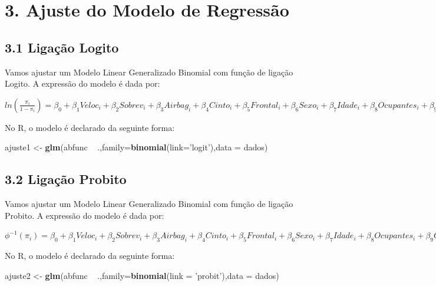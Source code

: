 \documentclass[]{article}
\newenvironment{Shaded}{\begin{snugshade}}{\end{snugshade}}
\newcommand{\KeywordTok}[1]{\textcolor[rgb]{0.13,0.29,0.53}{\textbf{{#1}}}}
\newcommand{\DataTypeTok}[1]{\textcolor[rgb]{0.13,0.29,0.53}{{#1}}}
\newcommand{\StringTok}[1]{\textcolor[rgb]{0.31,0.60,0.02}{{#1}}}
\newcommand{\NormalTok}[1]{{#1}}
\begin{document}
\section{3. Ajuste do Modelo de
Regressão}\label{ajuste-do-modelo-de-regressao}

\subsection{\texorpdfstring{\textbf{3.1 Ligação
Logito}}{3.1 Ligação Logito}}\label{ligacao-logito}

Vamos ajustar um Modelo Linear Generalizado Binomial com função de
ligação Logito. A expressão do modelo é dada por:

\(ln (\frac{\pi_i}{1-\pi_i}) = \beta_0 + \beta_1 Veloc_i + \beta_2 Sobrev_i + \beta_3 Airbag_i + \beta_4 Cinto_i + \beta_5 Frontal_i + \beta_6 Sexo_i + \beta_7 Idade_i + \beta_8 Ocupantes_i + \beta_9 Grav_i\)

No R, o modelo é declarado da seguinte forma:

\begin{Shaded}
\begin{Highlighting}[]
\NormalTok{ajuste1 <-}\StringTok{ }\KeywordTok{glm}\NormalTok{(abfunc ~}\StringTok{ }\NormalTok{.,}\DataTypeTok{family=}\KeywordTok{binomial}\NormalTok{(}\DataTypeTok{link=}\StringTok{'logit'}\NormalTok{),}\DataTypeTok{data =} \NormalTok{dados)}
\end{Highlighting}
\end{Shaded}

\subsection{\texorpdfstring{\textbf{3.2 Ligação
Probito}}{3.2 Ligação Probito}}\label{ligacao-probito}

Vamos ajustar um Modelo Linear Generalizado Binomial com função de
ligação Probito. A expressão do modelo é dada por:

\(\phi^{-1} (\pi_i) = \beta_0 + \beta_1 Veloc_i + \beta_2 Sobrev_i + \beta_3 Airbag_i + \beta_4 Cinto_i + \beta_5 Frontal_i + \beta_6 Sexo_i + \beta_7 Idade_i + \beta_8 Ocupantes_i + \beta_9 Grav_i\)

No R, o modelo é declarado da seguinte forma:

\begin{Shaded}
\begin{Highlighting}[]
\NormalTok{ajuste2 <-}\StringTok{ }\KeywordTok{glm}\NormalTok{(abfunc ~}\StringTok{ }\NormalTok{.,}\DataTypeTok{family=}\KeywordTok{binomial}\NormalTok{(}\DataTypeTok{link =} \StringTok{'probit'}\NormalTok{),}\DataTypeTok{data =} \NormalTok{dados)}
\end{Highlighting}
\end{Shaded}
\end{document}
